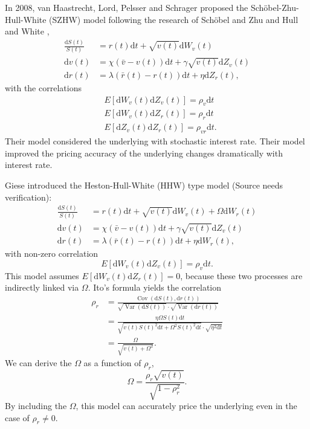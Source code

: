 \documentclass[12pt]{report}
\begin{document}
In 2008, van Haastrecht, Lord, Pelsser and Schrager \cite{van2008pricing} proposed the Schöbel-Zhu-Hull-White (SZHW) model following the research of Schöbel and Zhu \cite{schobel1999stochastic} and Hull and White \cite{hull1993one}, 
\begin{align}
\frac{\mathrm{d} S(t)}{S(t)} &= r(t) \mathrm{d} t + \sqrt{v(t)} \mathrm{d} W_{v}(t) \\
\mathrm{d} v(t) &= \chi\left(\bar{v}-v(t)\right) \mathrm{d} t+\gamma \sqrt{v(t)} \mathrm{d} Z_v(t) \\
\mathrm{d} r(t) &= \lambda\left(\bar{r}(t)-r(t)\right) \mathrm{d} t+\eta \mathrm{d} Z_{r}(t),
\end{align}
with the correlations 
\begin{align}
&E\left[\mathrm{d} W_{v}(t) \mathrm{d} Z_{v}(t)\right] =\rho_{v} \mathrm{d} t \\
&E\left[\mathrm{d} W_{v}(t) \mathrm{d} Z_{r}(t)\right] =\rho_{r} \mathrm{d} t \\
&E\left[\mathrm{d} Z_{v}(t) \mathrm{d} Z_{r}(t)\right] =\rho_{vr} \mathrm{d} t. 
\end{align}
Their model considered the underlying with stochastic interest rate. Their model improved the pricing accuracy of the underlying changes dramatically with interest rate.   

Giese introduced the Heston-Hull-White (HHW) type model \cite{giese2006pricing} (Source needs verification):
\begin{align}
\frac{\mathrm{d} S(t)}{S(t)} &= r(t) \mathrm{d} t + \sqrt{v(t)} \mathrm{d} W_{v}(t) +\Omega \mathrm{d} W_{r}(t) \\
\mathrm{d} v(t) &= \chi\left(\bar{v}-v(t)\right) \mathrm{d} t+\gamma \sqrt{v(t)} \mathrm{d} Z_v(t) \\
\mathrm{d} r(t) &= \lambda\left(\bar{r}(t)-r(t)\right) \mathrm{d} t+\eta \mathrm{d} W_{r}(t),
\end{align}
with non-zero correlation
\begin{equation}
E\left[\mathrm{d} W_{v}(t) \mathrm{d} Z_{v}(t)\right] =\rho_{v} \mathrm{d} t.
\end{equation}
This model assumes $E\left[\mathrm{d} W_{v}(t) \mathrm{d} Z_{r}(t)\right]=0$, because these two processes are indirectly linked via $\Omega$. Ito's formula yields the correlation 
\begin{align}
\rho_{r} &=\frac{\operatorname{Cov}\left(\mathrm{d} S(t), \mathrm{d} r(t)\right)}{\sqrt{\operatorname{Var}\left(\mathrm{d} S(t)\right)} \cdot \sqrt{\operatorname{Var}\left(\mathrm{d} r(t)\right)}} \\
&=\frac{\eta \Omega S(t) \mathrm{d} t}{\sqrt{v(t) S(t)^{2} \mathrm{d} t+\Omega^{2} S(t)^{2} \mathrm{d} t} \cdot \sqrt{\eta^{2} \mathrm{d} t}}\\
&=\frac{\Omega}{\sqrt{v(t)+\Omega^{2}}} .
\end{align}
We can derive the $\Omega$ as a function of $\rho_r$,
\begin{equation}
    \Omega = \frac{\rho_r \sqrt{v(t)}}{\sqrt{1-\rho^2_r}}.
\end{equation}
By including the $\Omega$, this model can accurately price the underlying even in the case of $\rho_r \neq 0$.
\end{document}
